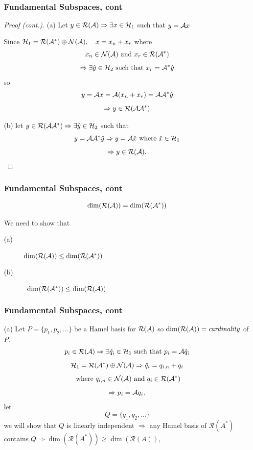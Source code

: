 \documentclass{beamer}
\begin{document}
\begin{frame}\frametitle{Fundamental Subspaces, cont}
	\begin{proof}[Proof (cont.)]
		\noindent (a) Let $y \in \mathcal{R}(\mathcal{A}) \Rightarrow \exists x \in \mathcal{H}_1 $ such that $ y = \mathcal{A} x$

		Since $\mathcal{H}_1 = \mathcal{R}(\mathcal{A}^\ast) \oplus \mathcal{N}(\mathcal{A}), \quad x  = x_n + x_r$ where
		\[ x_n \in \mathcal{N}(\mathcal{A}) \text{ and } x_r \in \mathcal{R}(\mathcal{A}^\ast) \]
		\[ \Rightarrow \exists \hat{y} \in \mathcal{H}_2 \text{ such that } x_r = \mathcal{A}^\ast\hat{y}\]
		so
		\[ y = \mathcal{A} x = \mathcal{A}(x_n + x_r) = \mathcal{A}\mathcal{A}^\ast\hat{y} \]
		\[ \Rightarrow y \in \mathcal{R}(\mathcal{A}\mathcal{A}^\ast) \]	 
		
		\noindent (b) let $y \in \mathcal{R}(\mathcal{A}\mathcal{A}^\ast) \Rightarrow \exists \hat{y} \in \mathcal{H}_2 $ such that
		\[ y = \mathcal{A}\mathcal{A}^\ast\hat{y} \Rightarrow y = \mathcal{A}\hat{x} \text{ where } \hat{x} \in \mathcal{H}_1 \]
		\[ \Rightarrow y \in \mathcal{R}(\mathcal{A}). \]	
	\end{proof}
	
\end{frame}

\begin{frame}\frametitle{Fundamental Subspaces, cont}
	\begin{theorem}
		\[ 
		\dim(\mathcal{R}(\mathcal{A})) = \dim(\mathcal{R}(\mathcal{A}^\ast)) 
		\]
	\end{theorem}
	
	\begin{proofstart}
		We need to show that
		\begin{description}
			\item[(a)] $ \dim(\mathcal{R}(\mathcal{A})) \leq \dim(\mathcal{R}(\mathcal{A}^\ast)) $
			\item[(b)]\ $ \dim(\mathcal{R}(\mathcal{A}^\ast)) \leq \dim(\mathcal{R}(\mathcal{A})) $
		\end{description}
	\end{proofstart}
\end{frame}

\begin{frame}\frametitle{Fundamental Subspaces, cont}
	\begin{proofstart}
		(a) Let $P = \{ p_1, p_2, \ldots \}$ be a Hamel basis for $\mathcal{R}(\mathcal{A})$ so $\dim(\mathcal{R}(\mathcal{A})) = \mathit{cardinality}$ of $P$.
		\[ p_i \in \mathcal{R}(\mathcal{A}) \Rightarrow \exists \hat{q}_i \in \mathcal{H}_1 \text{ such that } p_i = \mathcal{A}\hat{q}_i \]
		\[ \mathcal{H}_1 = \mathcal{R}(\mathcal{A}^\ast) \oplus \mathcal{N}(\mathcal{A}) \Rightarrow \hat{q}_i = q_{i,n} + q_i \]
		\[ \text{ where } q_{i,n} \in \mathcal{N}(\mathcal{A}) \text{ and } q_i \in \mathcal{R}(\mathcal{A}^\ast) \]
		\[ \Rightarrow p_i = \mathcal{A} q_i,\] let
		\[ Q = \{ q_1, q_2, \ldots \} \] we will show that $Q$ is linearly independent $\Rightarrow $ any Hamel basis of $\mathcal{R}(A^\ast)$ contains $Q \Rightarrow \dim(\mathcal{R}(A^\ast)) \geq \dim(\mathcal{R}(A))$,


	\end{proofstart}
\end{frame}
\end{document}
